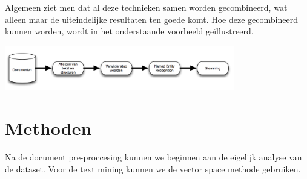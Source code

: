 \newline
Algemeen ziet men dat al deze technieken samen worden gecombineerd, wat alleen maar de uiteindelijke resultaten ten goede komt. Hoe deze gecombineerd kunnen worden, wordt in het onderstaande voorbeeld ge\"illustreerd. 
\begin{center}
  \includegraphics[width=10cm]{document_preprocessing}
\end{center}

\section{Methoden}\label{Methoden}
Na de document pre-proccesing kunnen we beginnen aan de eigelijk analyse van de dataset. Voor de text mining kunnen we de vector space methode gebruiken.
